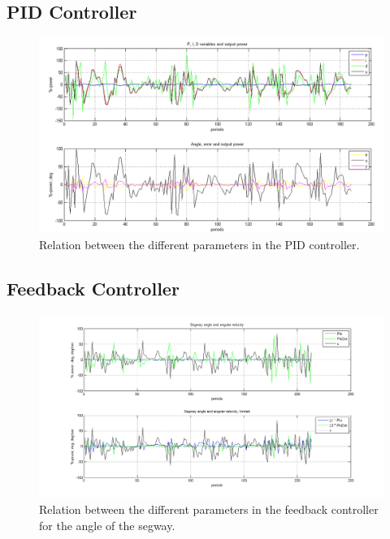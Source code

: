 \documentclass[a4paper]{article}
\begin{document}
\subsection{PID Controller}
\begin{figure}[H]
  \centering
\includegraphics[scale=0.47]{pic/pid.png}
\caption{Relation between the different parameters in the PID controller.}
\end{figure}

\subsection{Feedback Controller}
\begin{figure}[H]
  \centering
\includegraphics[scale=0.45]{pic/feedbackPlot.png}
\caption{Relation between the different parameters in the feedback controller for the angle of the segway.}
\end{figure}
\end{document}
